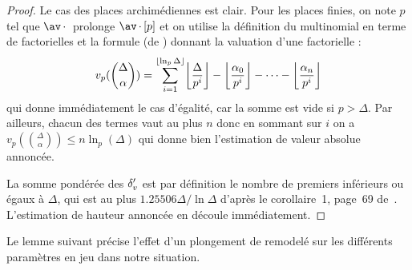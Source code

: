 \begin{proof}
  Le cas des places archimédiennes est clair. Pour les places finies, on note
  \( p \) tel que \( \av\truc \) prolonge \( \av\truc[p] \) et on
  utilise la définition du multinomial en terme de factorielles et la formule
  (de ) donnant la valuation d'une factorielle :
  \begin{equation}
    v_p( \binom\Delta\alpha )
    =
    \sum_{i = 1}^{\floor{\ln_p\Delta}}
    \floor*{ \frac{\Delta}{p^i} }
    - \floor*{ \frac{\alpha_0}{p^i} }
    - \dots
    - \floor*{ \frac{\alpha_n}{p^i} }
  \end{equation}
  qui donne immédiatement le cas d'égalité, car la somme est vide si \(
    p > \Delta \). Par ailleurs, chacun des termes vaut au plus \( n \) donc
  en sommant sur \( i \) on a \( v_p( \binom\Delta\alpha ) \le n \ln_p(\Delta)
  \) qui donne bien l'estimation de valeur absolue annoncée.

  La somme pondérée des \( {\delta'\sb v} \) est par définition le nombre de premiers
  inférieurs ou égaux à \( \Delta \), qui est au plus
  \( 1.25506 \Delta / \ln \Delta \) d'après le corollaire~1, page~69
  de~\cite{rosch}. L'estimation de hauteur annoncée en découle immédiatement.
\end{proof}

Le lemme suivant précise l'effet d'un plongement de  remodelé
sur les différents paramètres en jeu dans notre situation.

